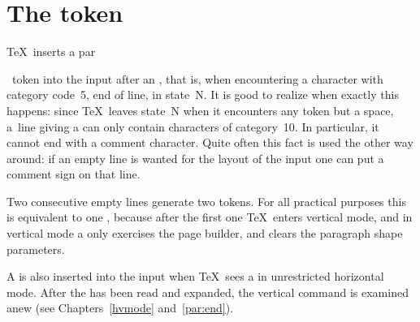\documentclass{book}
\begin{document}
\section{The \lowercase{} token}

\TeX\ inserts a \csterm par\par\ token into the input after
an , that is, when 
encountering a character with category code~5,
end of line, in state~{\italic N}.
It is good to realize when exactly this happens:
since \TeX\ leaves state~{\italic N}
when it encounters any token but a space,
a~line giving a  can only contain characters
of category~10. In particular, it cannot end with a comment
character. Quite often this fact is used the other way around:
if an empty line is wanted for the layout of the input
one can put a comment sign on that line.


Two consecutive empty lines generate two  tokens.
For all practical purposes this is equivalent to one ,
because after the first one \TeX\ enters vertical mode, and
in vertical mode a  only
exercises the page builder,
and clears the paragraph shape parameters.

A  is also inserted into the input when \TeX\ sees a
 in unrestricted horizontal mode.
After the  has been read and expanded, the
vertical command is examined anew (see Chapters~\ref{hvmode}
and~\ref{par:end}).
\end{document}
